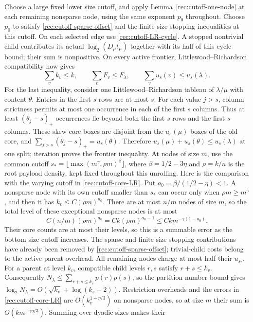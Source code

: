 Choose a large fixed lower size cutoff, and apply
Lemma~\ref{rec:cutoff-one-node} at each remaining nonsparse node,
using the same exponent $p_0$ throughout.  Choose $p_0$ to satisfy
\eqref{rec:cutoff-sparse-offset} and the finite-size stopping inequalities
at this cutoff.  On each selected edge use
\eqref{rec:cutoff-LR-cycle}.  A stopped nontrivial child contributes
its actual $\log_2(D_\mu t_\mu)$ together with its half of this cycle
bound; their sum is nonpositive.  On every active frontier,
Littlewood--Richardson compatibility now gives
\[
 \sum_v k_v\le k,\qquad
 \sum_vF_v\le F_\lambda,\qquad
 \sum_vu_s(v)\le u_s(\lambda).
\]
For the last inequality, consider one Littlewood--Richardson tableau
of $\lambda/\mu$ with content $\theta$.  Entries in the first $s$
rows are at most $s$.  For each value $j>s$, column strictness permits
at most one occurrence in each of the first $s$ columns.  Thus at least
$(\theta_j-s)_+$ occurrences lie beyond both the first $s$ rows and
the first $s$ columns.  These skew core boxes are disjoint from the
$u_s(\mu)$ boxes of the old core, and
$\sum_{j>s}(\theta_j-s)_+=u_s(\theta)$.  Therefore
$u_s(\mu)+u_s(\theta)\le u_s(\lambda)$ at one split; iteration
proves the frontier inequality.
At nodes of size $m$, use the common cutoff
$s_* =\lfloor\max(m^\gamma,\rho m)^\beta\rfloor$,
where $\beta=1/2-3\eta$ and $\rho=k/n$ is the root payload density,
kept fixed throughout this unrolling.
Here is the comparison with the varying cutoff in
\eqref{rec:cutoff-core-LR}.  Put
$a_0=\beta/(1/2-\eta)<1$.  A nonsparse node with its own cutoff
smaller than $s_*$ can occur only when $\rho m\ge m^\gamma$,
and then it has $k_v\le C(\rho m)^{a_0}$.
There are at most $n/m$ nodes of size $m$, so the total level of
these exceptional nonsparse nodes is at most
\[
 C(n/m)(\rho m)^{a_0}
 =Ck(\rho m)^{a_0-1}
 \le Ck m^{-\gamma(1-a_0)}.
\]
Their core counts are at most their levels, so this is a summable error
as the bottom size cutoff increases.  The sparse and finite-size stopping
contributions have already been removed by
\eqref{rec:cutoff-sparse-offset}; trivial-child costs belong to the
active-parent overhead.  All remaining nodes charge at most half their
$u_{s_*}$.
For a parent at level $k_v$, compatible child levels $r,s$ satisfy
$r+s\le k_v$.  Consequently
$N_\lambda\le\sum_{r+s\le k_v}p(r)p(s)$, so the partition-number
bound gives $\log_2N_\lambda=O(\sqrt{k_v}+\log(k_v+2))$.
Restriction overheads and the errors in
\eqref{rec:cutoff-core-LR} are
$O(k_v^{1-\eta/3})$ on nonsparse nodes, so at size $m$ their sum
is $O(km^{-\gamma\eta/3})$.  Summing over dyadic sizes makes their
